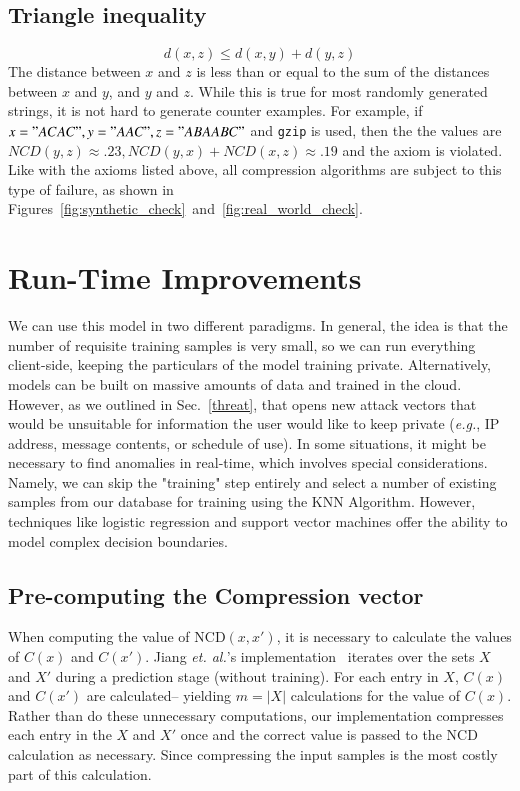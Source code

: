 \documentclass[preprint,12pt]{elsarticle}
\begin{document}
\subsection{Triangle inequality}
$$
    d(x, z) \leq d(x, y) + d(y, z)
$$
The distance between $x$ and $z$ is less than or equal to the sum of the distances between $x$ and $y$, and $y$ and $z$. While this is true for most randomly generated strings, it is not hard to generate counter examples.
For example, if $ x = "ACAC", y = "AAC", z = "ABAABC" $ and \texttt{gzip} is used, then the the values are $ NCD(y,z) \approx .23, NCD(y,x) + NCD(x,z) \approx .19 $ and the axiom is violated.
Like with the axioms listed above, all compression algorithms are subject to this type of failure, as shown in Figures~\ref{fig:synthetic_check}~and~\ref{fig:real_world_check}.


\section{Run-Time Improvements}
\label{improvements}
We can use this model in two different paradigms. In general, the idea is that the number of requisite training samples is very small, so we can run everything client-side, keeping the particulars of the model training private.
Alternatively, models can be built on massive amounts of data and trained in the cloud.
However, as we outlined in Sec.~\ref{threat}, that opens new attack vectors that would be unsuitable for information the user would like to keep private (\textit{e.g.}, IP address, message contents, or schedule of use).
In some situations, it might be necessary to find anomalies in real-time, which involves special considerations.
Namely, we can skip the "training" step entirely and select a number of existing samples from our database for training using the KNN Algorithm.
However, techniques like logistic regression and support vector machines offer the ability to model complex decision boundaries.



\subsection{Pre-computing the Compression vector}
When computing the value of NCD$(x,x')$, it is necessary to calculate the values of $C(x)$ and $C(x')$.
Jiang \textit{et. al.}'s implementation~\cite{jiang2022less} iterates over the sets $X$ and $X'$ during a prediction stage (without training).
For each entry in $X$, $C(x)$  and $C(x')$ are calculated-- yielding $m = | X |$ calculations for the value of $C(x)$.
Rather than do these unnecessary computations, our implementation compresses each entry in the $X$ and $X'$ once and the correct value is passed to the NCD calculation as necessary.
Since compressing the input samples is the most costly part of this calculation.
\end{document}
